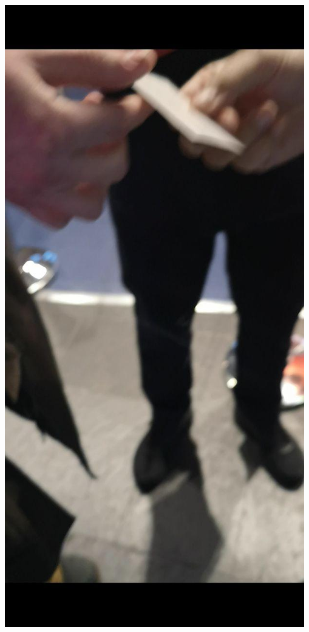 \documentclass{../../myassignment}
\begin{document}
	\includegraphics[scale=0.25]{pictures2/transaction.jpg}
\end{document}

